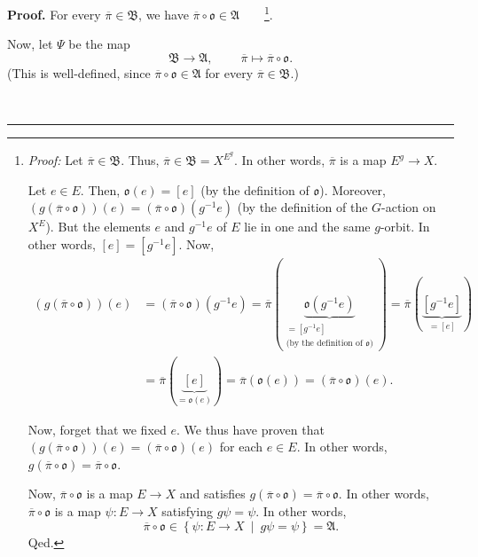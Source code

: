 \documentclass[numbers=enddot,12pt,final,onecolumn,notitlepage,abstracton]{scrartcl}
\theoremstyle{definition}
\newenvironment{proof}[1][Proof]{\noindent\textbf{#1.} }{\ \rule{0.5em}{0.5em}}
\newenvironment{verlong}{}{}
\begin{document}
\begin{verlong}
\begin{proof}
For every $\overline{\pi}\in\mathfrak{B}$, we have $\overline{\pi}%
\circ\mathfrak{o}\in\mathfrak{A}$\ \ \ \ \footnote{\textit{Proof:} Let
$\overline{\pi}\in\mathfrak{B}$. Thus, $\overline{\pi}\in\mathfrak{B}%
=X^{E^{g}}$. In other words, $\overline{\pi}$ is a map $E^{g}\rightarrow X$.
\par
Let $e\in E$. Then, $\mathfrak{o}\left(  e\right)  =\left[  e\right]  $ (by
the definition of $\mathfrak{o}$). Moreover, $\left(  g\left(  \overline{\pi
}\circ\mathfrak{o}\right)  \right)  \left(  e\right)  =\left(  \overline{\pi
}\circ\mathfrak{o}\right)  \left(  g^{-1}e\right)  $ (by the definition of the
$G$-action on $X^{E}$). But the elements $e$ and $g^{-1}e$ of $E$ lie in one
and the same $g$-orbit. In other words, $\left[  e\right]  =\left[
g^{-1}e\right]  $. Now,%
\begin{align*}
\left(  g\left(  \overline{\pi}\circ\mathfrak{o}\right)  \right)  \left(
e\right)   &  =\left(  \overline{\pi}\circ\mathfrak{o}\right)  \left(
g^{-1}e\right)  =\overline{\pi}\left(  \underbrace{\mathfrak{o}\left(
g^{-1}e\right)  }_{\substack{=\left[  g^{-1}e\right]  \\\text{(by the
definition of }\mathfrak{o}\text{)}}}\right)  =\overline{\pi}\left(
\underbrace{\left[  g^{-1}e\right]  }_{=\left[  e\right]  }\right)  \\
&  =\overline{\pi}\left(  \underbrace{\left[  e\right]  }_{=\mathfrak{o}%
\left(  e\right)  }\right)  =\overline{\pi}\left(  \mathfrak{o}\left(
e\right)  \right)  =\left(  \overline{\pi}\circ\mathfrak{o}\right)  \left(
e\right)  .
\end{align*}
\par
Now, forget that we fixed $e$. We thus have proven that $\left(  g\left(
\overline{\pi}\circ\mathfrak{o}\right)  \right)  \left(  e\right)  =\left(
\overline{\pi}\circ\mathfrak{o}\right)  \left(  e\right)  $ for each $e\in E$.
In other words, $g\left(  \overline{\pi}\circ\mathfrak{o}\right)
=\overline{\pi}\circ\mathfrak{o}$.
\par
Now, $\overline{\pi}\circ\mathfrak{o}$ is a map $E\rightarrow X$ and satisfies
$g\left(  \overline{\pi}\circ\mathfrak{o}\right)  =\overline{\pi}%
\circ\mathfrak{o}$. In other words, $\overline{\pi}\circ\mathfrak{o}$ is a map
$\psi:E\rightarrow X$ satisfying $g\psi=\psi$. In other words,%
\[
\overline{\pi}\circ\mathfrak{o}\in\left\{  \psi:E\rightarrow X\ \mid
\ g\psi=\psi\right\}  =\mathfrak{A}.
\]
Qed.}.

Now, let $\Psi$ be the map%
\[
\mathfrak{B}\rightarrow\mathfrak{A},\ \ \ \ \ \ \ \ \ \ \overline{\pi}%
\mapsto\overline{\pi}\circ\mathfrak{o}.
\]
(This is well-defined, since $\overline{\pi}\circ\mathfrak{o}\in\mathfrak{A}$
for every $\overline{\pi}\in\mathfrak{B}$.)


\end{proof}
\end{verlong}
\end{document}
